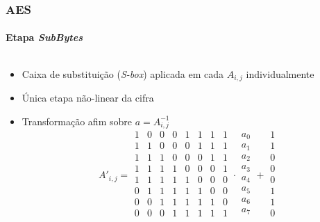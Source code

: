 \documentclass[12pt]{beamer}
\begin{document}
\begin{frame}
  \frametitle{AES}
  \framesubtitle{Etapa \emph{SubBytes}}
  \begin{columns}[T]
    \begin{column}{.7\textwidth}
      \begin{itemize}
        \item Caixa de substituição (\emph{S-box}) aplicada em cada $A_{i,j}$
            individualmente
        \item Única etapa não-linear da cifra
        \item Transformação afim sobre $a = A^{-1}_{i,j}$
          \begin{equation*}
            A'_{i,j} =
            \begin{smallmatrix}
              1 & 0 & 0 & 0 & 1 & 1 & 1 & 1 \\
              1 & 1 & 0 & 0 & 0 & 1 & 1 & 1 \\
              1 & 1 & 1 & 0 & 0 & 0 & 1 & 1 \\
              1 & 1 & 1 & 1 & 0 & 0 & 0 & 1 \\
              1 & 1 & 1 & 1 & 1 & 0 & 0 & 0 \\
              0 & 1 & 1 & 1 & 1 & 1 & 0 & 0 \\
              0 & 0 & 1 & 1 & 1 & 1 & 1 & 0 \\
              0 & 0 & 0 & 1 & 1 & 1 & 1 & 1 \\
            \end{smallmatrix} \cdot
            \begin{smallmatrix}
              a_0 \\ a_1 \\ a_2 \\ a_3 \\ a_4 \\ a_5 \\ a_6 \\ a_7 \\
            \end{smallmatrix} +
            \begin{smallmatrix}
              1 \\ 1 \\ 0 \\ 0 \\ 0 \\ 1 \\ 1 \\ 0 \\
            \end{smallmatrix}

\end{equation*}
\end{itemize}
\end{column}
\end{columns}
\end{frame}
\end{document}
